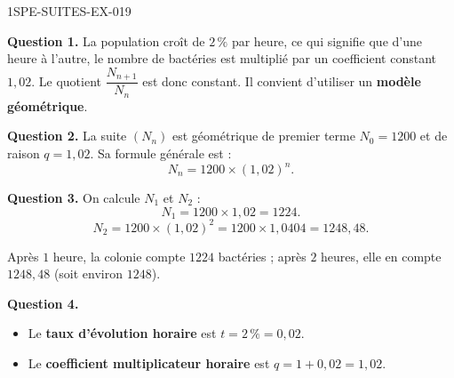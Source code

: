 \begin{corrige}{1SPE-SUITES-EX-019}


\textbf{Question 1.} La population croît de $2\,\%$ par heure, ce qui signifie que d'une heure à l'autre, le nombre de bactéries est multiplié par un coefficient constant $1{,}02$. Le quotient $\dfrac{N_{n+1}}{N_n}$ est donc constant. Il convient d'utiliser un \textbf{modèle géométrique}.


\textbf{Question 2.} La suite $(N_n)$ est géométrique de premier terme $N_0 = 1200$ et de raison $q = 1{,}02$. Sa formule générale est :
\[
N_n = 1200 \times (1{,}02)^n.
\]

\textbf{Question 3.} On calcule $N_1$ et $N_2$ :
\[
N_1 = 1200 \times 1{,}02 = 1224.
\]
\[
N_2 = 1200 \times (1{,}02)^2 = 1200 \times 1{,}0404 = 1248{,}48.
\]

Après $1$ heure, la colonie compte $1224$ bactéries ; après $2$ heures, elle en compte $1248{,}48$ (soit environ $1248$).


\textbf{Question 4.}
\begin{itemize}
  \item Le \textbf{taux d'évolution horaire} est $t = 2\,\% = 0{,}02$.
  \item Le \textbf{coefficient multiplicateur horaire} est $q = 1 + 0{,}02 = 1{,}02$.
\end{itemize}

\end{corrige}
